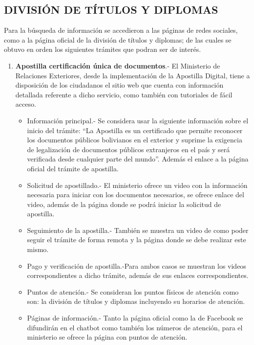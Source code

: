\documentclass[letter, openright, 12pt]{book}
\begin{document}
\subsection{DIVISIÓN DE TÍTULOS Y DIPLOMAS}

Para la búsqueda de información se accedieron a las páginas de redes sociales, como a la página oficial de la división de títulos y diplomas; de las cuales se obtuvo en orden los siguientes trámites que podran ser de interés.

\begin{enumerate}[label=(\alph*)]
\item \textbf{Apostilla certificación única de documentos}.- El Ministerio de Relaciones Exteriores, desde la implementación de la Apostilla Digital, tiene a disposición de los ciudadanos el sitio web que cuenta con información detallada referente a dicho servicio, como también con tutoriales de fácil acceso. 
\begin{itemize}
\item Información principal.- Se considera usar la siguiente información sobre el inicio del trámite: “La Apostilla es un certificado que permite reconocer los documentos públicos bolivianos en el exterior y suprime la exigencia de legalización de documentos públicos extranjeros en el país y será verificada desde cualquier parte del mundo”. Además el enlace a la página oficial del trámite de apostilla.
\item Solicitud de apostillado.- El ministerio ofrece un video con la información necesaria para iniciar con los documentos necesarios, se ofrece enlace del video, además de la página donde se podrá iniciar la solicitud de apostilla. 
\item Seguimiento de la apostilla.- También se muestra un video de como poder seguir el trámite de forma remota y la página donde se debe realizar este mismo.
\item Pago y verificación de apostilla.-Para ambos casos se muestran los videos correspondientes a dicho trámite, además de sus enlaces correspondientes.
\item Puntos de atención.- Se consideran los puntos físicos de atención como son: la división de títulos y diplomas incluyendo su horarios de atención. 
\item Páginas de información.- Tanto la página oficial como la de Facebook se difundirán en el chatbot como también los números de atención,  para el ministerio se ofrece la página con puntos de atención.
\end{itemize}


\end{enumerate}
\end{document}
